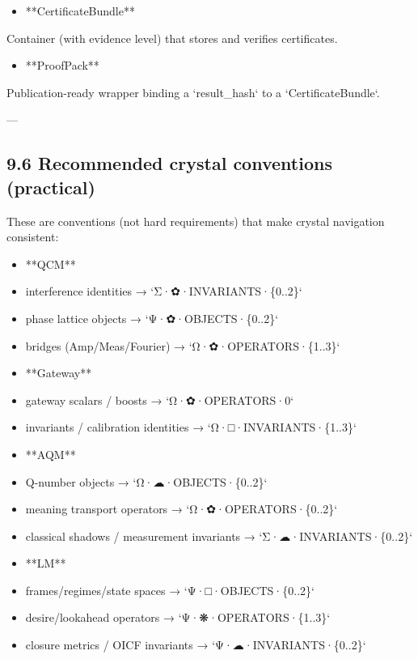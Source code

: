 \documentclass[11pt]{article}
\begin{document}
\begin{itemize}
\item **CertificateBundle**
\end{itemize}
  Container (with evidence level) that stores and verifies certificates.

\begin{itemize}
\item **ProofPack**
\end{itemize}
  Publication-ready wrapper binding a `result\_hash` to a `CertificateBundle`.

---

\subsection{9.6 Recommended crystal conventions (practical)}

These are conventions (not hard requirements) that make crystal navigation consistent:

\begin{itemize}
\item **QCM**
\item interference identities → `Σ·✿·INVARIANTS·\{0..2\}`
\item phase lattice objects → `Ψ·✿·OBJECTS·\{0..2\}`
\item bridges (Amp/Meas/Fourier) → `Ω·✿·OPERATORS·\{1..3\}`
\end{itemize}

\begin{itemize}
\item **Gateway**
\item gateway scalars / boosts → `Ω·✿·OPERATORS·0`
\item invariants / calibration identities → `Ω·□·INVARIANTS·\{1..3\}`
\end{itemize}

\begin{itemize}
\item **AQM**
\item Q-number objects → `Ω·☁·OBJECTS·\{0..2\}`
\item meaning transport operators → `Ω·✿·OPERATORS·\{0..2\}`
\item classical shadows / measurement invariants → `Σ·☁·INVARIANTS·\{0..2\}`
\end{itemize}

\begin{itemize}
\item **LM**
\item frames/regimes/state spaces → `Ψ·□·OBJECTS·\{0..2\}`
\item desire/lookahead operators → `Ψ·❋·OPERATORS·\{1..3\}`
\item closure metrics / OICF invariants → `Ψ·☁·INVARIANTS·\{0..2\}`
\end{itemize}
\end{document}
